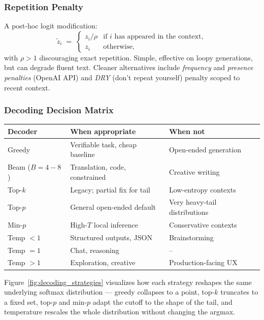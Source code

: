 \subsubsection{Repetition Penalty}

A post-hoc logit modification:
\begin{equation}
\tilde z_i \;=\; \begin{cases}
z_i / \rho & \text{if $i$ has appeared in the context}, \\
z_i        & \text{otherwise},
\end{cases}
\end{equation}
with $\rho > 1$ discouraging exact repetition. Simple, effective on
loopy generations, but can degrade fluent text. Cleaner alternatives
include \emph{frequency} and \emph{presence penalties} (OpenAI API)
and \emph{DRY} (don't repeat yourself) penalty scoped to recent
context.

\subsubsection{Decoding Decision Matrix}

\begin{center}
\begin{tabular}{|l|l|l|}
\hline
Decoder & When appropriate & When not \\
\hline
Greedy           & Verifiable task, cheap baseline & Open-ended generation \\
Beam ($B = 4{-}8$) & Translation, code, constrained  & Creative writing \\
Top-$k$          & Legacy; partial fix for tail     & Low-entropy contexts \\
Top-$p$          & General open-ended default        & Very heavy-tail distributions \\
Min-$p$          & High-$T$ local inference          & Conservative contexts \\
Temp $< 1$       & Structured outputs, JSON          & Brainstorming \\
Temp $= 1$       & Chat, reasoning                   & -- \\
Temp $> 1$       & Exploration, creative             & Production-facing UX \\
\hline
\end{tabular}
\end{center}

Figure~\ref{fig:decoding_strategies} visualizes how each strategy
reshapes the same underlying softmax distribution --- greedy
collapses to a point, top-$k$ truncates to a fixed set, top-$p$ and
min-$p$ adapt the cutoff to the shape of the tail, and temperature
rescales the whole distribution without changing the argmax.

